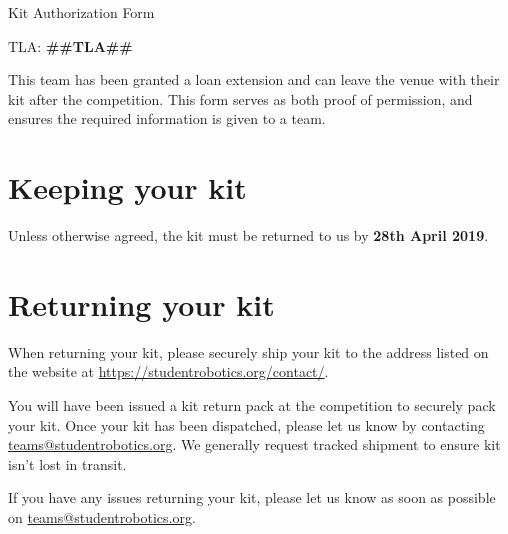 \documentclass[a4paper, 12pt]{article}
\begin{document}
\setlength{\parskip}{3mm}

\begin{center}

    {\huge{Kit Authorization Form}}

\end{center}

\bigskip

{\Large{TLA: \textbf{##TLA##}}}

\bigskip

This team has been granted a loan extension and can leave the venue with their kit after the competition. This form serves as both proof of permission, and ensures the required information is given to a team.

\section{Keeping your kit}

Unless otherwise agreed, the kit must be returned to us by \textbf{28th April 2019}.

\section{Returning your kit}

When returning your kit, please securely ship your kit to the address listed on the website at \url{https://studentrobotics.org/contact/}.

You will have been issued a kit return pack at the competition to securely pack your kit. Once your kit has been dispatched, please let us know by contacting \href{mailto:teams@studentrobotics.org}{teams@studentrobotics.org}. We generally request tracked shipment to ensure kit isn't lost in transit.

If you have any issues returning your kit, please let us know as soon as possible on \href{mailto:teams@studentrobotics.org}{teams@studentrobotics.org}.
\end{document}
